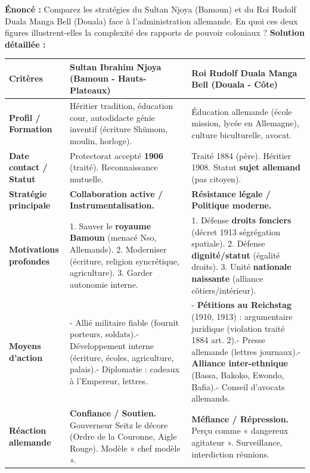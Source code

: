 \documentclass[11pt]{article}
\begin{document}
\begin{exoresolu}
\textbf{Énoncé :} Comparez les stratégies du Sultan Njoya (Bamoun) et du Roi Rudolf Duala Manga Bell (Douala) face à l'administration allemande. En quoi ces deux figures illustrent-elles la complexité des rapports de pouvoir coloniaux ?
\tcblower
\textbf{Solution détaillée :}
\begin{center}
\begin{tabularx}{\linewidth}{|l|X|X|}
\hline
\textbf{Critères} & \textbf{Sultan Ibrahim Njoya (Bamoun - Hauts-Plateaux)} & \textbf{Roi Rudolf Duala Manga Bell (Douala - Côte)} \\
\hline
\textbf{Profil / Formation} & Héritier tradition, éducation cour, autodidacte génie inventif (écriture Shümom, moulin, horloge). & Éducation allemande (école mission, lycée en Allemagne), culture biculturelle, avocat. \\
\hline
\textbf{Date contact / Statut} & Protectorat accepté \textbf{1906} (traité). Reconnaissance mutuelle. & Traité 1884 (père). Héritier 1908. Statut \textbf{sujet allemand} (pas citoyen). \\
\hline
\textbf{Stratégie principale} & \textbf{Collaboration active / Instrumentalisation.} & \textbf{Résistance légale / Politique moderne.} \\
\hline
\textbf{Motivations profondes} & 1. Sauver le \textbf{royaume Bamoun} (menacé Nso, Allemands). 2. Moderniser (écriture, religion syncrétique, agriculture). 3. Garder autonomie interne. & 1. Défense \textbf{droits fonciers} (décret 1913 ségrégation spatiale). 2. Défense \textbf{dignité/statut} (égalité droits). 3. Unité \textbf{nationale naissante} (alliance côtiers/intérieur). \\
\hline
\textbf{Moyens d'action} & - Allié militaire fiable (fournit porteurs, soldats).\newline - Développement interne (écriture, écoles, agriculture, palais).\newline - Diplomatie : cadeaux à l'Empereur, lettres. & - \textbf{Pétitions au Reichstag} (1910, 1913) : argumentaire juridique (violation traité 1884 art. 2).\newline - Presse allemande (lettres journaux).\newline - \textbf{Alliance inter-ethnique} (Bassa, Bakoko, Ewondo, Bafia).\newline - Conseil d'avocats allemands. \\
\hline
\textbf{Réaction allemande} & \textbf{Confiance / Soutien.} Gouverneur Seitz le décore (Ordre de la Couronne, Aigle Rouge). Modèle « chef modèle ». & \textbf{Méfiance / Répression.} Perçu comme « dangereux agitateur ». Surveillance, interdiction réunions. \\

\end{tabularx}
\end{center}
\end{exoresolu}
\end{document}
